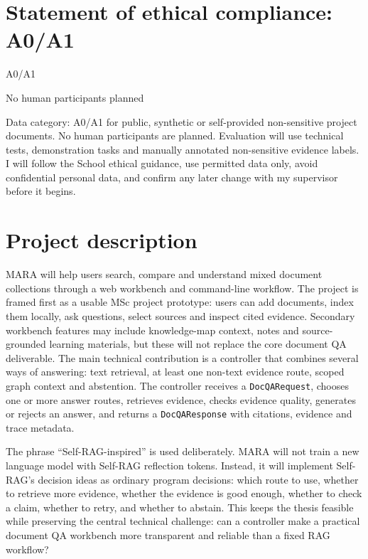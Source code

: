\documentclass[a4paper,11pt]{article}
\begin{document}
\section{Statement of ethical compliance: A0/A1}

\begin{description}\itemsep=0pt
\item[Data Category:] A0/A1
\item[Participant Category:] No human participants planned
\end{description}

Data category: A0/A1 for public, synthetic or self-provided non-sensitive project documents. No human participants are planned. Evaluation will use technical tests, demonstration tasks and manually annotated non-sensitive evidence labels. I will follow the School ethical guidance, use permitted data only, avoid confidential personal data, and confirm any later change with my supervisor before it begins.

\section{Project description}

MARA will help users search, compare and understand mixed document collections through a web workbench and command-line workflow. The project is framed first as a usable MSc project prototype: users can add documents, index them locally, ask questions, select sources and inspect cited evidence. Secondary workbench features may include knowledge-map context, notes and source-grounded learning materials, but these will not replace the core document QA deliverable. The main technical contribution is a controller that combines several ways of answering: text retrieval, at least one non-text evidence route, scoped graph context and abstention. The controller receives a \texttt{DocQARequest}, chooses one or more answer routes, retrieves evidence, checks evidence quality, generates or rejects an answer, and returns a \texttt{DocQAResponse} with citations, evidence and trace metadata.

The phrase ``Self-RAG-inspired'' is used deliberately. MARA will not train a new language model with Self-RAG reflection tokens. Instead, it will implement Self-RAG's decision ideas as ordinary program decisions: which route to use, whether to retrieve more evidence, whether the evidence is good enough, whether to check a claim, whether to retry, and whether to abstain. This keeps the thesis feasible while preserving the central technical challenge: can a controller make a practical document QA workbench more transparent and reliable than a fixed RAG workflow?
\end{document}
